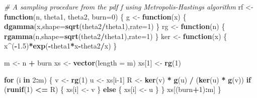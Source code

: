 \documentclass[
  11pt,
]{article}
\newenvironment{Shaded}{\begin{snugshade}}{\end{snugshade}}
\newcommand{\AttributeTok}[1]{\textcolor[rgb]{0.13,0.29,0.53}{#1}}
\newcommand{\CommentTok}[1]{\textcolor[rgb]{0.56,0.35,0.01}{\textit{#1}}}
\newcommand{\ControlFlowTok}[1]{\textcolor[rgb]{0.13,0.29,0.53}{\textbf{#1}}}
\newcommand{\DecValTok}[1]{\textcolor[rgb]{0.00,0.00,0.81}{#1}}
\newcommand{\FloatTok}[1]{\textcolor[rgb]{0.00,0.00,0.81}{#1}}
\newcommand{\FunctionTok}[1]{\textcolor[rgb]{0.13,0.29,0.53}{\textbf{#1}}}
\newcommand{\NormalTok}[1]{#1}
\newcommand{\OtherTok}[1]{\textcolor[rgb]{0.56,0.35,0.01}{#1}}
\newcommand{\SpecialCharTok}[1]{\textcolor[rgb]{0.81,0.36,0.00}{\textbf{#1}}}
\begin{document}
\begin{Shaded}
\begin{Highlighting}[]
\CommentTok{\# A sampling procedure from the pdf f using Metropolis{-}Hastings algorithm}
\NormalTok{rf }\OtherTok{\textless{}{-}} \ControlFlowTok{function}\NormalTok{(n, theta1, theta2, }\AttributeTok{burn=}\DecValTok{0}\NormalTok{)}
\NormalTok{\{}
\NormalTok{    g }\OtherTok{\textless{}{-}} \ControlFlowTok{function}\NormalTok{(x) \{ }\FunctionTok{dgamma}\NormalTok{(x,}\AttributeTok{shape=}\FunctionTok{sqrt}\NormalTok{(theta2}\SpecialCharTok{/}\NormalTok{theta1),}\AttributeTok{rate=}\DecValTok{1}\NormalTok{) \}}
\NormalTok{    rg }\OtherTok{\textless{}{-}} \ControlFlowTok{function}\NormalTok{(n) \{ }\FunctionTok{rgamma}\NormalTok{(n,}\AttributeTok{shape=}\FunctionTok{sqrt}\NormalTok{(theta2}\SpecialCharTok{/}\NormalTok{theta1),}\AttributeTok{rate=}\DecValTok{1}\NormalTok{) \}}
\NormalTok{    ker }\OtherTok{\textless{}{-}} \ControlFlowTok{function}\NormalTok{(x) \{ x}\SpecialCharTok{\^{}}\NormalTok{(}\SpecialCharTok{{-}}\FloatTok{1.5}\NormalTok{)}\SpecialCharTok{*}\FunctionTok{exp}\NormalTok{(}\SpecialCharTok{{-}}\NormalTok{theta1}\SpecialCharTok{*}\NormalTok{x}\SpecialCharTok{{-}}\NormalTok{theta2}\SpecialCharTok{/}\NormalTok{x) \}}
  
\NormalTok{    m }\OtherTok{\textless{}{-}}\NormalTok{ n }\SpecialCharTok{+}\NormalTok{ burn}
\NormalTok{    xs }\OtherTok{\textless{}{-}} \FunctionTok{vector}\NormalTok{(}\AttributeTok{length =}\NormalTok{ m)}
\NormalTok{    xs[}\DecValTok{1}\NormalTok{] }\OtherTok{\textless{}{-}} \FunctionTok{rg}\NormalTok{(}\DecValTok{1}\NormalTok{)}
    
    \ControlFlowTok{for}\NormalTok{ (i }\ControlFlowTok{in} \DecValTok{2}\SpecialCharTok{:}\NormalTok{m) \{}
\NormalTok{        v }\OtherTok{\textless{}{-}} \FunctionTok{rg}\NormalTok{(}\DecValTok{1}\NormalTok{)}
\NormalTok{        u }\OtherTok{\textless{}{-}}\NormalTok{ xs[i}\DecValTok{{-}1}\NormalTok{]}
\NormalTok{        R }\OtherTok{\textless{}{-}} \FunctionTok{ker}\NormalTok{(v) }\SpecialCharTok{*} \FunctionTok{g}\NormalTok{(u) }\SpecialCharTok{/}\NormalTok{ (}\FunctionTok{ker}\NormalTok{(u) }\SpecialCharTok{*} \FunctionTok{g}\NormalTok{(v))}
        \ControlFlowTok{if}\NormalTok{ (}\FunctionTok{runif}\NormalTok{(}\DecValTok{1}\NormalTok{) }\SpecialCharTok{\textless{}=}\NormalTok{ R) \{ xs[i] }\OtherTok{\textless{}{-}}\NormalTok{ v \}}
        \ControlFlowTok{else}\NormalTok{ \{ xs[i] }\OtherTok{\textless{}{-}}\NormalTok{ u \}}
\NormalTok{    \}}
\NormalTok{    xs[(burn}\SpecialCharTok{+}\DecValTok{1}\NormalTok{)}\SpecialCharTok{:}\NormalTok{m]}
\NormalTok{\}}
\end{Highlighting}
\end{Shaded}
\end{document}
